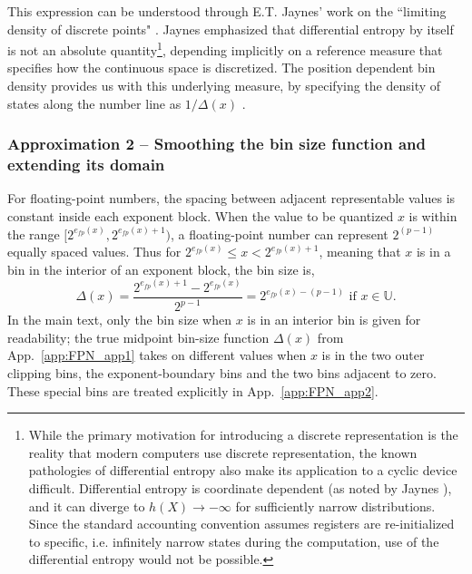 \documentclass[12pt,onecolumn, margin=1in]{IEEEtran}
\begin{document}
This expression can be understood through E.T. Jaynes' work on the ``limiting density of discrete points" \cite{Jaynes1968-limiting}. Jaynes emphasized that differential entropy by itself is not an absolute quantity\footnote{While the primary motivation for introducing a discrete representation is the reality that modern computers use discrete representation, the known pathologies of differential entropy also make its application to a cyclic device difficult. Differential entropy is coordinate dependent (as noted by Jaynes \cite{Jaynes1968-limiting}), and it can diverge to $h(X) \rightarrow - \infty$ for sufficiently narrow distributions. Since the standard accounting convention assumes registers are re-initialized to specific, i.e. infinitely narrow states during the computation, use of the differential entropy would not be possible.}, depending implicitly on a reference measure that specifies how the continuous space is discretized. The position dependent bin density provides us with this underlying measure, by specifying the density of states along the number line as $1/\Delta(x)$ \cite{Jaynes1968-limiting}.





\subsubsection*{Approximation 2 -- Smoothing the bin size function and extending its domain}

For floating-point numbers, the spacing between adjacent representable values is constant inside each exponent block. When the value to be quantized $x$ is within the range $[2^{e_{fp}(x)}, 2^{e_{fp}(x)+1})$, a floating-point number can represent $2^{(p-1)}$ equally spaced values. Thus for $2^{e_{fp}(x)} \leq x < 2^{e_{fp}(x)+1}$, meaning that $x$ is in a bin in the interior of an exponent block, the bin size is, 
\begin{equation}
    \label{eq:true_bins}
    \Delta(x) = \frac{2^{e_{fp}(x)+1} - 2^{e_{fp}(x)}}{2^{p-1}}= 2^{e_{fp}(x) - (p-1)} \text{ if }x \in \mathbb{U}.
\end{equation}
In the main text, only the bin size when $x$ is in an interior bin is given for readability; the true midpoint bin-size function $\Delta(x)$ from App.~\ref{app:FPN_app1} takes on different values when $x$ is in the two outer clipping bins, the exponent-boundary bins and the two bins adjacent to zero. These special bins are treated explicitly in App.~\ref{app:FPN_app2}.
\end{document}
